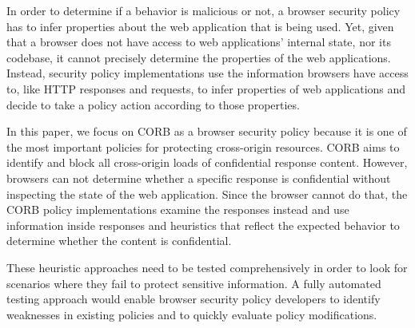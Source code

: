 \documentclass[10pt,conference]{IEEEtran}
\begin{document}
In order to determine if a behavior is malicious or not, a browser security policy has to infer properties about the web application that is being used. Yet, given that a browser does not have access to web applications' internal state, nor its codebase, it cannot precisely determine the properties of the web applications. Instead, security policy implementations use the information browsers have access to, like HTTP responses and requests, to infer properties of web applications and decide to take a policy action according to those properties. %

In this paper, we focus on CORB as a browser security policy because it is one of the most important policies for protecting cross-origin resources. CORB aims to identify and block all cross-origin loads of confidential response content. However, browsers can not determine whether a specific response is confidential without inspecting the state of the web application. Since the browser cannot do that, the CORB policy implementations examine the responses instead and use information inside responses and heuristics that reflect the expected behavior to determine whether the content is confidential.


These heuristic approaches need to be tested comprehensively in order to look for scenarios where they fail to protect sensitive information. A fully automated testing approach would enable browser security policy developers to identify weaknesses in existing policies and to quickly evaluate policy modifications. 


\end{document}
